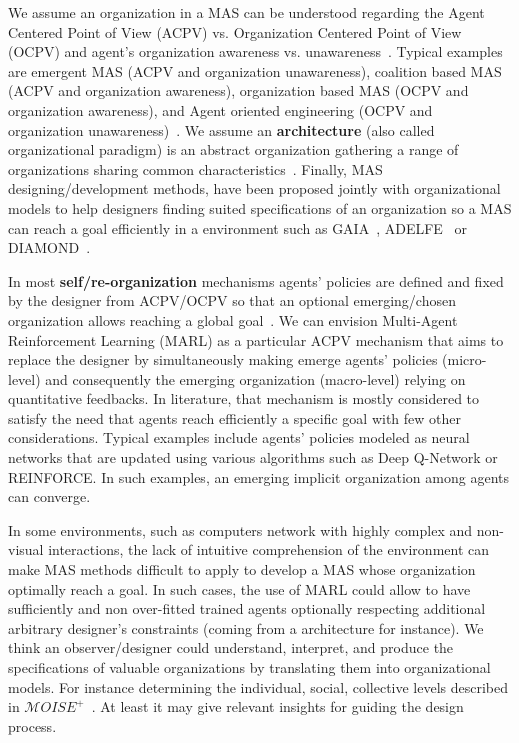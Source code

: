 \documentclass[runningheads]{llncs}
\begin{document}
We assume an organization in a MAS can be understood regarding the Agent Centered Point of View (ACPV) vs. Organization Centered Point of View (OCPV) and agent's organization awareness vs. unawareness~\cite{Picard2009}.
Typical examples are emergent MAS (ACPV and organization unawareness), coalition based MAS (ACPV and organization awareness), organization based MAS (OCPV and organization awareness), and Agent oriented engineering (OCPV and organization unawareness)~\cite{Picard2009}.
We assume an \textbf{architecture} (also called organizational paradigm) is an abstract organization gathering a range of organizations sharing common characteristics~\cite{Horling2004}. Finally, MAS designing/development methods, have been proposed jointly with organizational models to help designers finding suited specifications of an organization so a MAS can reach a goal efficiently in a environment such as GAIA~\cite{Wooldridge2000}, ADELFE~\cite{Bernon2003} or DIAMOND~\cite{Jamont2005}.

In most \textbf{self/re-organization} mechanisms agents' policies are defined and fixed by the designer from ACPV/OCPV so that an optional emerging/chosen organization allows reaching a global goal~\cite{Picard2009}. We can envision Multi-Agent Reinforcement Learning (MARL) as a particular ACPV mechanism that aims to replace the designer by simultaneously making emerge agents' policies (micro-level) and consequently the emerging organization (macro-level) relying on quantitative feedbacks. In literature, that mechanism is mostly considered to satisfy the need that agents reach efficiently a specific goal with few other considerations. Typical examples include agents' policies modeled as neural networks that are updated using various algorithms such as Deep Q-Network or REINFORCE. In such examples, an emerging implicit organization among agents can converge.

In some environments, such as computers network with highly complex and non-visual interactions, the lack of intuitive comprehension of the environment can make MAS methods difficult to apply to develop a MAS whose organization optimally reach a goal. In such cases, the use of MARL could allow to have sufficiently and non over-fitted trained agents optionally respecting additional arbitrary designer's constraints (coming from a architecture for instance). We think an observer/designer could understand, interpret, and produce the specifications of valuable organizations by translating them into organizational models. For instance determining the individual, social, collective levels described in $\mathcal{M}OISE^{+}$~\cite{Hubner2002}. At least it may give relevant insights for guiding the design process.
\end{document}
